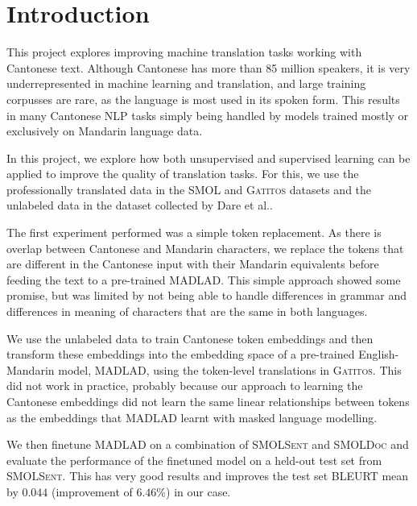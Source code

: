 \section{Introduction}
This project explores improving machine translation tasks working with Cantonese text. Although Cantonese has more than 85 million speakers, it is very underrepresented in machine learning and translation, and large training corpusses are rare, as the language is most used in its spoken form. This results in many Cantonese NLP tasks simply being handled by models trained mostly or exclusively on Mandarin language data.

In this project, we explore how both unsupervised and supervised learning can be applied to improve the quality of translation tasks. For this, we use the professionally translated data in the \textsc{SMOL}\cite{caswell2025smolprofessionallytranslatedparallel} and \textsc{Gatitos}\cite{jones-etal-2023-gatitos} datasets and the unlabeled data in the dataset collected by Dare et al.\cite{dare2023unsupervisedmandarincantonesemachinetranslation}.

The first experiment performed was a simple token replacement. As there is overlap between Cantonese and Mandarin characters, we replace the tokens that are different in the Cantonese input with their Mandarin equivalents before feeding the text to a pre-trained \textsc{MADLAD}\cite{kudugunta2023madlad400multilingualdocumentlevellarge}. This simple approach showed some promise, but was limited by not being able to handle differences in grammar and differences in meaning of characters that are the same in both languages.

We use the unlabeled data to train Cantonese token embeddings and then transform these embeddings into the embedding space of a pre-trained English-Mandarin model, \textsc{MADLAD}, using the token-level translations in \textsc{Gatitos}. This did not work in practice, probably because our approach to learning the Cantonese embeddings did not learn the same linear relationships between tokens as the embeddings that \textsc{MADLAD} learnt with masked language modelling.

We then finetune \textsc{MADLAD} on a combination of \textsc{SMOLSent} and \textsc{SMOLDoc} and evaluate the performance of the finetuned model on a held-out test set from \textsc{SMOLSent}. This has very good results and improves the test set BLEURT mean by $0.044$ (improvement of $6.46\%$) in our case.